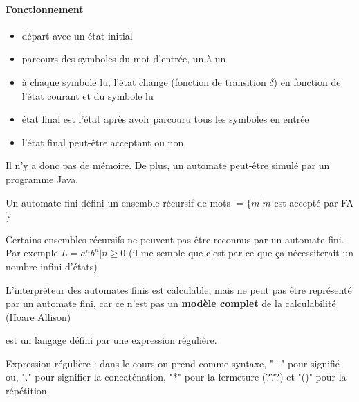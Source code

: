 \paragraph{Fonctionnement}
\begin{itemize}
	\item départ avec un état initial
	\item parcours des symboles du mot d'entrée, un à un
	\item à chaque symbole lu, l'état change (fonction de transition 
		$\delta$) en fonction de l'état courant et du symbole lu
	\item état final est l'état après avoir parcouru tous les symboles en 
		entrée
	\item l'état final peut-être acceptant ou non
\end{itemize}

\begin{myrem}
	Il n'y a donc pas de mémoire. De plus, un automate peut-être simulé 
	par un programme Java.
\end{myrem}

\begin{myprop}
	Un automate fini défini un ensemble récursif de mots $=\{m|m$ est 
		accepté par FA$\}$
\end{myprop}

\begin{myprop}
	Certains ensembles récursifs ne peuvent pas être reconnus par un 
	automate fini. Par exemple $L = { a^n b^n | n\geq 0}$ (il me semble que 
	c'est par ce que ça nécessiterait un nombre infini d'états)
\end{myprop}

\begin{myprop}
	L'interpréteur des automates finis est calculable, mais ne peut pas être 
	représenté par un automate fini, car ce n'est pas un \textbf{modèle 
	complet} de la calculabilité (Hoare Allison)
\end{myprop}

\begin{mydef} est un langage défini par une expression 
	régulière.
\end{mydef}

\begin{mydef}
	Expression régulière :  dans le cours on prend comme syntaxe, "+" pour 
	signifié ou, "." pour signifier la concaténation, "*" pour la 
	fermeture (???) et "()" pour la répétition.
\end{mydef}

